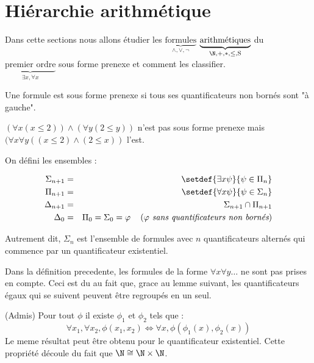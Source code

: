\section{Hiérarchie arithmétique}


Dans cette sections nous allons étudier les $\underbrace{\text{formules}}_{\land, \lor, \lnot}$
$\underbrace{\text{arithmétiques}}_{\N, +, *, \leq, \text{S}}$ du $\underbrace{\text{premier ordre}}_{\exists x, \forall x}$
sous forme prenexe et comment les classifier.


\begin{definition}
	Une formule est sous forme prenexe si tous ses quantificateurs non bornés sont "à gauche".

	$(\forall x (x \leq 2)) \land  (\forall y (2 \leq y))$ n'est pas sous forme prenexe mais $(\forall x \forall y ((x \leq 2) \land  (2 \leq x))$ l'est.
\end{definition}



\begin{definition}
	On défini les ensembles :

	\begin{eqnarray*}
		\Sigma_{n + 1} &=& \setdef { \exists x \psi } {\psi \in \Pi_n}  \\
		\Pi_{n + 1} &=& \setdef { \forall x \psi } {\psi \in \Sigma_n}  \\
		\Delta_{n + 1} &=& \Sigma_{n + 1} \cap \Pi_{n + 1} \\
		\Delta_0 &=& \Pi_0 = \Sigma_0= \phi \reason {$\phi$ sans quantificateurs non bornés}
	\end{eqnarray*}

	Autrement dit, $\Sigma_n$ est l'ensemble de formules avec $n$ quantificateurs alternés qui commence par un quantificateur existentiel.
\end{definition}

\begin{remarque}
	Dans la définition precedente, les formules de la forme $\forall x \forall y \ldots$ ne sont pas prises en compte. Ceci est du au fait que, grace
	au lemme suivant, les quantificateurs égaux qui se suivent peuvent être regroupés en un seul.
\end{remarque}

\begin{lemma}(Admis)
	Pour tout $\phi$ il existe $\phi_1$ et $\phi_2$ tels que :
	$$ \forall x_1, \forall x_2, \phi (x_1,x_2) \iff \forall x, \phi(\phi_1(x), \phi_2(x))$$
	Le meme résultat peut être obtenu pour le quantificateur existentiel.
	Cette propriété découle du fait que $\N \cong \N \times \N$.
\end{lemma}

